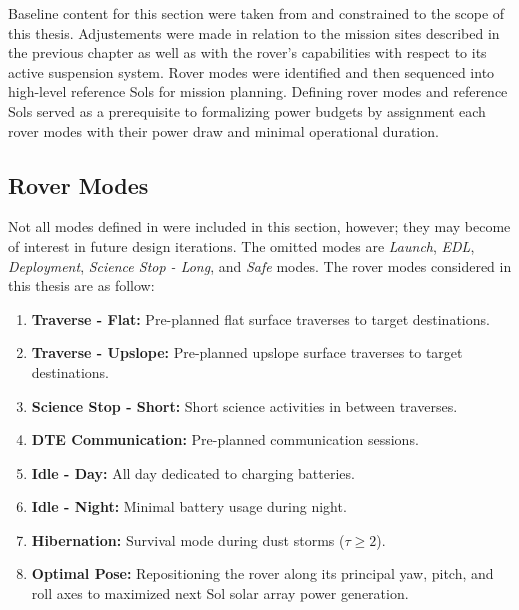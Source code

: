 Baseline content for this section were taken from  and constrained to the scope of this thesis. Adjustements were made in relation to the mission sites described in the previous chapter as well as with the rover's capabilities with respect to its active suspension system. Rover modes were identified and then sequenced into high-level reference Sols for mission planning. Defining rover modes and reference Sols served as a prerequisite to formalizing power budgets by assignment each rover modes with their power draw and minimal operational duration.


\subsection{Rover Modes}
\label{sec:ReferenceSols:RoverModes}
Not all modes defined in  were included in this section, however; they may become of interest in future design iterations. The omitted modes are \textit{Launch}, \textit{\ac{EDL}}, \textit{Deployment}, \textit{Science Stop - Long},  and \textit{Safe} modes. The rover modes considered in this thesis are as follow:

\begin{enumerate}[label=\textbf{\textcolor{BulletBlue}{(\alph*)}}]
    \item \textbf{Traverse - Flat:} Pre-planned flat surface traverses to target destinations.
    \item \textbf{Traverse - Upslope:} Pre-planned upslope surface traverses to target destinations.
    \item \textbf{Science Stop - Short:} Short science activities in between traverses.
    \item \textbf{\ac{DTE} Communication:} Pre-planned communication sessions.
    \item \textbf{Idle - Day:} All day dedicated to charging batteries.
    \item \textbf{Idle - Night:} Minimal battery usage during night.
    \item \textbf{Hibernation:} Survival mode during dust storms ($\tau \geq 2$).
    \item \textbf{Optimal Pose:} Repositioning the rover along its principal yaw, pitch, and roll axes to maximized next Sol solar array power generation.
\end{enumerate}

